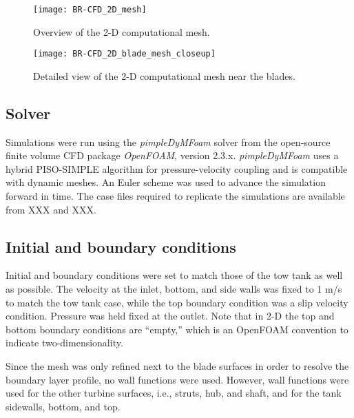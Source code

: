 \begin{figure}
    \centering
    
    \texttt{[image: BR-CFD\_2D\_mesh]}

    \caption{Overview of the 2-D computational mesh.}

    \label{fig:2d-br-mesh}
\end{figure}


\begin{figure}
    \centering
    
    \texttt{[image: BR-CFD\_2D\_blade\_mesh\_closeup]}

    \caption{Detailed view of the 2-D computational mesh near the blades.}

    \label{fig:blade-mesh}
\end{figure}


\subsection{Solver}

Simulations were run using the \textit{pimpleDyMFoam} solver from the
open-source finite volume CFD package \textit{OpenFOAM}, version 2.3.x.
\textit{pimpleDyMFoam} uses a hybrid PISO-SIMPLE algorithm for pressure-velocity
coupling and is compatible with dynamic meshes. An Euler scheme was used to
advance the simulation forward in time. The case files required to replicate the
simulations are available from XXX and XXX. 


\subsection{Initial and boundary conditions}

Initial and boundary conditions were set to match those of the tow tank as well
as possible. The velocity at the inlet, bottom, and side walls was fixed to 1
m/s to match the tow tank case, while the top boundary condition was a slip
velocity condition. Pressure was held fixed at the outlet. Note that in 2-D the
top and bottom boundary conditions are ``empty,'' which is an OpenFOAM
convention to indicate two-dimensionality.

Since the mesh was only refined next to the blade surfaces in order to resolve
the boundary layer profile, no wall functions were used. However, wall functions
were used for the other turbine surfaces, i.e., struts, hub, and shaft, and for
the tank sidewalls, bottom, and top.


